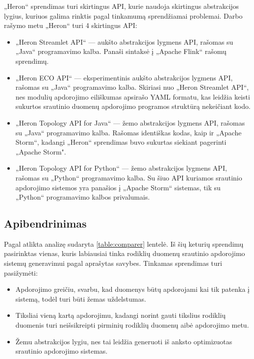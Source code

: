 \documentclass{VUMIFPSbakalaurinis}
\begin{document}
„Heron“ sprendimas turi skirtingus API, kurie naudoja skirtingus abstrakcijos lygius, kuriuos galima rinktis pagal tinkamumą sprendžiamai problemai. Darbo rašymo metu „Heron“ turi 4 skirtingus API:
\begin{itemize}
    \item „Heron Streamlet API“ — aukšto abstrakcijos lygmens API, rašomas su „Java“ programavimo kalba. Panaši sintaksė į „Apache Flink“ rašomų sprendimų.
    \item „Heron ECO API“ — eksperimentinis aukšto abstrakcijos lygmens API, rašomas su „Java“ programavimo kalba. Skiriasi nuo „Heron Streamlet API“, nes modulių apdorojimo eiliškumas apsirašo YAML formatu, kas leidžia keisti sukurtos srautinio duomenų apdorojimo programos struktūrą nekeičiant kodo.
    \item „Heron Topology API for Java“ — žemo abstrakcijos lygmens API, rašomas su „Java“ programavimo kalba. Rašomas identiškas kodas, kaip ir „Apache Storm“, kadangi „Heron“ sprendimas buvo sukurtas siekiant pagerinti „Apache Storm".
    \item „Heron Topology API for Python“ — žemo abstrakcijos lygmens API, rašomas su „Python“ programavimo kalba. Su šiuo API kuriamos srautinio apdorojimo sistemos yra panašios į „Apache Storm“ sistemas, tik su „Python“ programavimo kalbos privalumais.
\end{itemize}  


\subsection{Apibendrinimas}

Pagal atlikta analizę sudaryta \ref{table:comparer} lentelė. Iš šių keturių sprendimų pasirinktas vienas, kuris labiausiai tinka rodiklių duomenų srautinio apdorojimo sistemų generavimui pagal aprašytas savybes. Tinkamas sprendimas turi pasižymėti: 
\begin{itemize}
    \item Apdorojimo greičiu, svarbu, kad duomenys būtų apdorojami kai tik patenka į sistemą, todėl turi būti žemas uždelstumas.
    \item Tiksliai vieną kartą apdorojimu, kadangi norint gauti tikslius rodiklių duomenis turi neišsikreipti pirminių rodiklių duomenų aibė apdorojimo metu.
    \item Žemu abstrakcijos lygiu, nes tai leidžia generuoti iš anksto optimizuotas srautinio apdorojimo sistemas.  
\end{itemize} 
\end{document}
